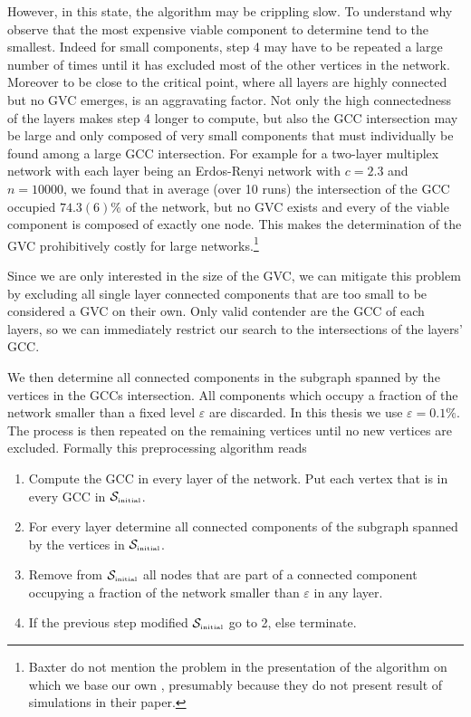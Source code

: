 \documentclass[
11pt, %
english, %
singlespacing, %
nolistspacing, %
liststotoc, %
headsepline, %
]{MastersDoctoralThesis} %
\begin{document}
However, in this state, the algorithm may be crippling slow. To understand why observe that the most expensive viable component to determine tend to the smallest. Indeed for small components, step 4 may have to be repeated a large number of times until it has excluded most of the other vertices in the network. Moreover to be close to the critical point, where all layers are highly connected but no GVC emerges, is an aggravating factor. Not only the high connectedness of the layers makes step 4 longer to compute, but also the GCC intersection may be large and only composed of very small components that must individually be found among a large GCC intersection. For example for a two-layer multiplex network with each layer being an Erdos-Renyi network with $c = 2.3$ and $n = 10000$, we found that in average (over 10 runs) the intersection of the GCC occupied $74.3(6) \%$ of the network, but  no GVC exists and every of the viable component is composed of exactly one node. This makes the determination of the GVC prohibitively costly for large networks.\footnote{Baxter \etal{} do not mention the problem in the presentation of the algorithm on which we base our own \cite{baxter2012avalanche}, presumably because they do not present result of simulations in their paper.}

Since we are only interested in the size of the GVC, we can mitigate this problem by excluding all single layer connected components that are too small to be considered a GVC on their own. Only valid contender are the GCC of each layers, so we can immediately restrict our search to the intersections of the layers' GCC.

We then determine all connected components in the subgraph spanned by the vertices in the GCCs intersection. All components which occupy a fraction of the network smaller than a fixed level $\varepsilon$ are discarded. In this thesis we use $\varepsilon = 0.1\%$. The process is then repeated on the remaining vertices until no new vertices are excluded. Formally this preprocessing algorithm reads

\begin{enumerate}
	\item Compute the GCC in every layer of the network. Put each vertex that is in every GCC in $\mathcal{S}_{\text{\tiny initial}}$.
	\item For every layer determine all connected components of the subgraph spanned by the vertices in $\mathcal{S}_{\text{\tiny initial}}$.
	\item Remove from $\mathcal{S}_{\text{\tiny initial}}$ all nodes that are part of a connected component occupying a fraction of the network smaller than $\varepsilon$ in any layer.
	\item If the previous step modified $\mathcal{S}_{\text{\tiny initial}}$ go to 2, else terminate.
\end{enumerate}
\end{document}
